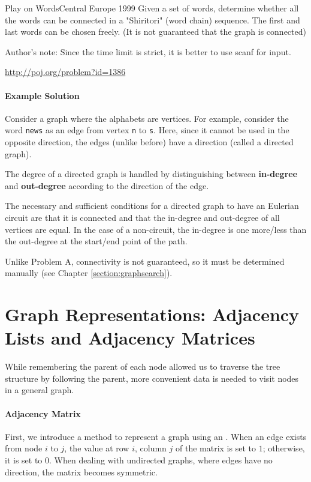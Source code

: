 \begin{pbox}{Play on Words}{Central Europe 1999}
Given a set of words, determine whether all the words can be connected in a "Shiritori" (word chain) sequence.
The first and last words can be chosen freely.
(It is not guaranteed that the graph is connected)

Author's note: Since the time limit is strict, it is better to use scanf for input.

\url{http://poj.org/problem?id=1386}  
\end{pbox}

\paragraph{Example Solution}
Consider a graph where the alphabets are vertices.
For example, consider the word \texttt{news} as an edge from vertex \texttt{n} to \texttt{s}. Here, since it cannot be used in the opposite direction, the edges (unlike before) have a direction (called a directed graph).

The degree of a directed graph is handled by distinguishing between \textbf{in-degree} and \textbf{out-degree} according to the direction of the edge.

The necessary and sufficient conditions for a directed graph to have an Eulerian circuit are that it is connected and that the in-degree and out-degree of all vertices are equal.
In the case of a non-circuit, the in-degree is one more/less than the out-degree at the start/end point of the path.

Unlike Problem A, connectivity is not guaranteed, so it must be determined manually (see Chapter \ref{section:graphsearch}).
\section{Graph Representations: Adjacency Lists and Adjacency Matrices}\label{section:adjacency-matrix}

While remembering the parent of each node allowed us to traverse the tree structure by following the parent, more convenient data is needed to visit nodes in a general graph.

\paragraph{Adjacency Matrix}
First, we introduce a method to represent a graph using an .
When an edge exists from node $i$ to $j$, the value at row $i$, column $j$ of the matrix is set to $1$; otherwise, it is set to $0$.
When dealing with undirected graphs, where edges have no direction, the matrix becomes symmetric.

